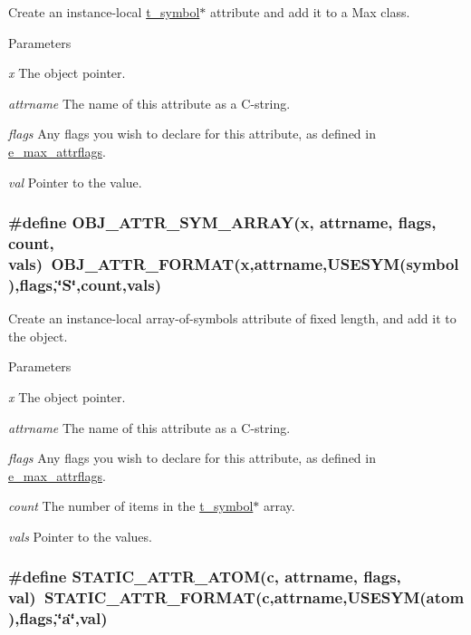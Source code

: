 Create an instance-\/local \hyperlink{structt__symbol}{t\_\-symbol}$\ast$ attribute and add it to a Max class. 
\begin{DoxyParams}{Parameters}
\item[{\em x}]The object pointer. \item[{\em attrname}]The name of this attribute as a C-\/string. \item[{\em flags}]Any flags you wish to declare for this attribute, as defined in \hyperlink{group__attr_gaf296cfc6741bb19207f6ed8062809115}{e\_\-max\_\-attrflags}. \item[{\em val}]Pointer to the value. \end{DoxyParams}
\hypertarget{group__attr_ga70a7471a5da2c8ba7fff3d9b2f7ec72c}{
\subsubsection[{OBJ\_\-ATTR\_\-SYM\_\-ARRAY}]{\setlength{\rightskip}{0pt plus 5cm}\#define OBJ\_\-ATTR\_\-SYM\_\-ARRAY(x, \/  attrname, \/  flags, \/  count, \/  vals)~OBJ\_\-ATTR\_\-FORMAT(x,attrname,USESYM(symbol),flags,\char`\"{}S\char`\"{},count,vals)}}
\label{group__attr_ga70a7471a5da2c8ba7fff3d9b2f7ec72c}


Create an instance-\/local array-\/of-\/symbols attribute of fixed length, and add it to the object. 
\begin{DoxyParams}{Parameters}
\item[{\em x}]The object pointer. \item[{\em attrname}]The name of this attribute as a C-\/string. \item[{\em flags}]Any flags you wish to declare for this attribute, as defined in \hyperlink{group__attr_gaf296cfc6741bb19207f6ed8062809115}{e\_\-max\_\-attrflags}. \item[{\em count}]The number of items in the \hyperlink{structt__symbol}{t\_\-symbol}$\ast$ array. \item[{\em vals}]Pointer to the values. \end{DoxyParams}
\hypertarget{group__attr_gaec89cd6df31efd155711a03c55f9d2db}{
\subsubsection[{STATIC\_\-ATTR\_\-ATOM}]{\setlength{\rightskip}{0pt plus 5cm}\#define STATIC\_\-ATTR\_\-ATOM(c, \/  attrname, \/  flags, \/  val)~STATIC\_\-ATTR\_\-FORMAT(c,attrname,USESYM(atom),flags,\char`\"{}a\char`\"{},val)}}
\label{group__attr_gaec89cd6df31efd155711a03c55f9d2db}


